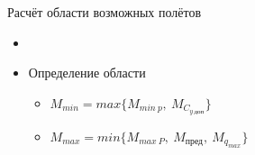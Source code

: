 \begin{frame}{Расчёт области возможных полётов}
    \begin{minipage}[c]{0.55\textwidth}
    \end{minipage}
    \begin{minipage}[c]{0.4\textwidth}
        \begin{itemize}
            \item <+-> []
            \item <+-> [] \begin{block}{Определение области}
                \begin{itemize}
                    \item $M_{min} = max \{ M_{min \ p}, \ M_{C_{y \ \text{доп}}} \} $
                    \item $M_{max} = min \{ M_{max \ P}, \ M_{\text{пред}}, \ M_{q_{max}} \}$
                \end{itemize}
            \end{block}
        \end{itemize}
    \end{minipage}
\end{frame}

